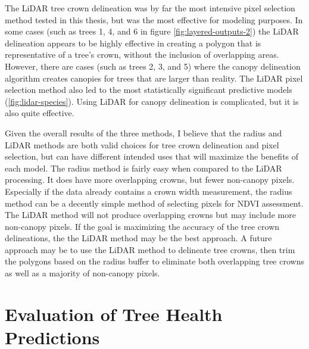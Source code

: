 \documentclass[12pt,twoside]{reedthesis}
\begin{document}
The LiDAR tree crown delineation was by far the most intensive pixel
selection method tested in this thesis, but was the most effective for
modeling purposes. In some cases (such as trees 1, 4, and 6 in figure
\ref{fig:layered-outputs-2}) the LiDAR delineation appears to be highly
effective in creating a polygon that is representative of a tree's
crown, without the inclusion of overlapping areas. However, there are
cases (such as trees 2, 3, and 5) where the canopy delineation algorithm
creates canopies for trees that are larger than reality. The LiDAR pixel
selection method also led to the most statistically significant
predictive models (\ref{fig:lidar-species}). Using LiDAR for canopy
delineation is complicated, but it is also quite effective.

Given the overall results of the three methods, I believe that the
radius and LiDAR methods are both valid choices for tree crown
delineation and pixel selection, but can have different intended uses
that will maximize the benefits of each model. The radius method is
fairly easy when compared to the LiDAR processing. It does have more
overlapping crowns, but fewer non-canopy pixels. Especially if the data
already contains a crown width measurement, the radius method can be a
decently simple method of selecting pixels for NDVI assessment. The
LiDAR method will not produce overlapping crowns but may include more
non-canopy pixels. If the goal is maximizing the accuracy of the tree
crown delineations, the the LiDAR method may be the best approach. A
future approach may be to use the LiDAR method to delineate tree crowns,
then trim the polygons based on the radius buffer to eliminate both
overlapping tree crowns as well as a majority of non-canopy pixels.

\hypertarget{evaluation-of-tree-health-predictions}{%
\section{Evaluation of Tree Health Predictions}\label{evaluation-of-tree-health-predictions}}
\end{document}
